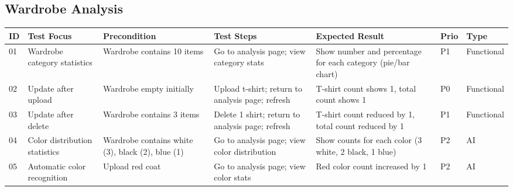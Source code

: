 \begin{appendices}
\begin{landscape}
\subsection*{Wardrobe Analysis}

\begin{longtable}{|p{0.8cm}|p{2.8cm}|p{3cm}|p{5.5cm}|p{5cm}|p{1.2cm}|p{1.8cm}|}
\hline
\textbf{ID} & \textbf{Test Focus} & \textbf{Precondition} & \textbf{Test Steps} & \textbf{Expected Result} & \textbf{Prio} & \textbf{Type} \\
\hline

01 & Wardrobe category statistics & Wardrobe contains 10 items & Go to analysis page; view category stats & Show number and percentage for each category (pie/bar chart) & P1 & Functional \\
\hline
02 & Update after upload & Wardrobe empty initially & Upload t-shirt; return to analysis page; refresh & T-shirt count shows 1, total count shows 1 & P0 & Functional \\
\hline
03 & Update after delete & Wardrobe contains 3 items & Delete 1 shirt; return to analysis page; refresh & T-shirt count reduced by 1, total count reduced by 1 & P1 & Functional \\
\hline
04 & Color distribution statistics & Wardrobe contains white (3), black (2), blue (1) & Go to analysis page; view color distribution & Show counts for each color (3 white, 2 black, 1 blue) & P2 & AI \\
\hline
05 & Automatic color recognition & Upload red coat & Go to analysis page; view color stats & Red color count increased by 1 & P2 & AI \\
\hline
\end{longtable}
\end{landscape}


\end{appendices}
